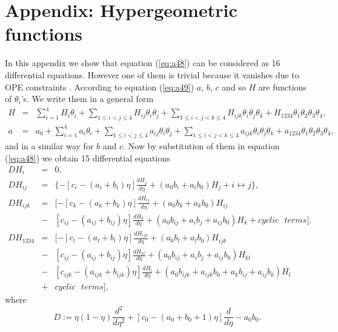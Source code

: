 \documentclass[a4paper,11pt]{article}
\begin{document}
\section{Appendix: Hypergeometric functions}
In this appendix we show that equation (\ref{eq:a48}) can be
considered as 16 differential equations. However one of them is
trivial because it vanishes due to OPE constraints
\cite{mog,floh2}. According to equation (\ref{eq:a49}) $a$, $b$,
$c$ and so $H$ are functions of $\theta_{i}$'s. We write them in
a general form
\begin{eqnarray}\label{eq:a78}
H&=&\sum_{i=1}^{4}H_{i}\theta_{i}+\sum_{1\leq
i<j\leq4}H_{ij}\theta_{i}\theta_{j}+ \sum_{1\leq
i<j<k\leq4}H_{ijk}\theta_{i}\theta_{j}\theta_{k}+H_{1234}
\theta_{1}\theta_{2}\theta_{3}\theta_{4},\nonumber\\
a&=&a_{0}+\sum_{i=1}^{4}a_{i}\theta_{i}+\sum_{1\leq
i<j\leq4}a_{ij}\theta_{i}\theta_{j}+ \sum_{1\leq
i<j<k\leq4}a_{ijk}\theta_{i}\theta_{j}\theta_{k}+a_{1234}
\theta_{1}\theta_{2}\theta_{3}\theta_{4},
\end{eqnarray}
and in a similar way for $b$ and $c$. Now by substitution of them
in equation (\ref{eq:a48}) we obtain 15 differential equations
\begin{eqnarray}\label{eq:a79}
DH_{i}&=&0,\nonumber\\
DH_{ij}&=&\{-[c_{i}-(a_{i}+b_{i})\eta]
\frac{dH_{j}}{d\eta}+(a_{0}b_{i}+a_{i}b_{0})H_{j}+
i\longleftrightarrow j\},\nonumber\\
DH_{ijk}&=&[-[c_{k}-(a_{k}+b_{k})\eta]\frac{dH_{ij}}{d\eta}+
(a_{0}b_{k}+a_{k}b_{0})H_{ij}\nonumber\\
&-&[c_{ij}-(a_{ij}+b_{ij})\eta]\frac{dH_{k}}{d\eta}
+(a_{0}b_{ij}+a_{i}b_{j}+a_{ij}b_{0})H_{k}+cyclic\:\:\: terms
],\nonumber\\
DH_{1234}&=&[-[c_{l}-(a_{l}+b_{l})\eta]\frac{dH_{ijk}}{d\eta}+(a_{0}b_{l}+a_{l}b_{0})H_{ijk}\nonumber\\
&-&[c_{ij}-(a_{ij}+b_{ij})\eta]\frac{dH_{kl}}{d\eta}+(a_{0}b_{ij}+a_{i}b_{j}+a_{ij}b_{0})H_{kl}\nonumber\\
&-&[c_{ijk}-(a_{ijk}+b_{ijk})\eta]\frac{dH_{l}}{d\eta}+(a_{0}b_{ijk}+a_{ijk}b_{0}+a_{k}b_{ij}+a_{ij}b_{k})H_{l}\nonumber\\
&+&cyclic\:\:\:terms],
\end{eqnarray}
where
\begin{equation}\label{eq:a83}
D:=\eta(1-\eta)\frac{d^{2}}{d\eta^{2}}+[c_{0}-(a_{0}+b_{0}+1)\eta]
\frac{d}{d\eta}-a_{0}b_{0}.
\end{equation}
\end{document}
